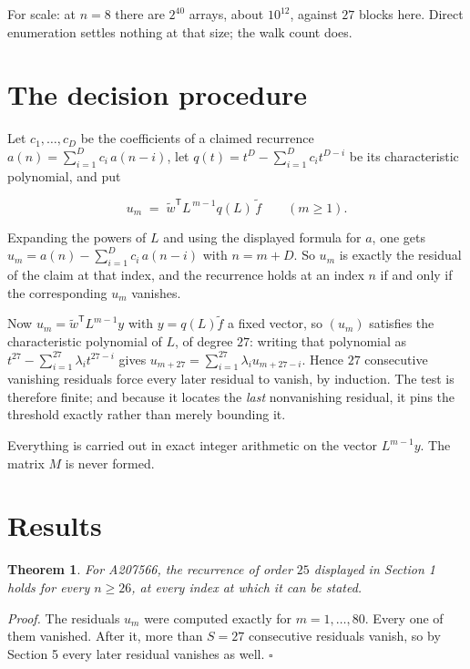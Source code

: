 \documentclass[11pt]{article}
\newtheorem{theorem}{Theorem}
\theoremstyle{definition}
\begin{document}
For scale: at $n = 8$ there are $2^{40}$ arrays, about $10^{12}$, against $27$ blocks here. Direct enumeration settles nothing at that size; the walk count does.

\section{The decision procedure}

Let $c_1,\dots,c_D$ be the coefficients of a claimed recurrence $a(n) = \sum_{i=1}^{D} c_i\,a(n-i)$, let $q(t) = t^{D} - \sum_{i=1}^{D} c_i t^{D-i}$ be its characteristic polynomial, and put

\[u_m \;=\; \tilde w^{\mathsf T} L^{\,m-1} q(L)\,\tilde f \qquad (m \ge 1).\]

Expanding the powers of $L$ and using the displayed formula for $a$, one gets $u_m = a(n) - \sum_{i=1}^{D} c_i\,a(n-i)$ with $n = m + D$. So $u_m$ is exactly the residual of the claim at that index, and the recurrence holds at an index $n$ if and only if the corresponding $u_m$ vanishes.

Now $u_m = \tilde w^{\mathsf T} L^{m-1} y$ with $y = q(L)\tilde f$ a fixed vector, so $(u_m)$ satisfies the characteristic polynomial of $L$, of degree $27$: writing that polynomial as $t^{27} - \sum_{i=1}^{27} \lambda_i t^{27-i}$ gives $u_{m+27} = \sum_{i=1}^{27} \lambda_i u_{m+27-i}$. Hence $27$ consecutive vanishing residuals force every later residual to vanish, by induction. The test is therefore finite; and because it locates the {\itshape last} nonvanishing residual, it pins the threshold exactly rather than merely bounding it.

Everything is carried out in exact integer arithmetic on the vector $L^{m-1}y$. The matrix $M$ is never formed.

\section{Results}

\begin{theorem} For A207566, the recurrence of order $25$ displayed in Section 1 holds for every $n \ge 26$, at every index at which it can be stated.\end{theorem}

{\itshape Proof.} The residuals $u_m$ were computed exactly for $m = 1,\dots,80$. Every one of them vanished. After it, more than $S = 27$ consecutive residuals vanish, so by Section 5 every later residual vanishes as well. $\square$
\end{document}
